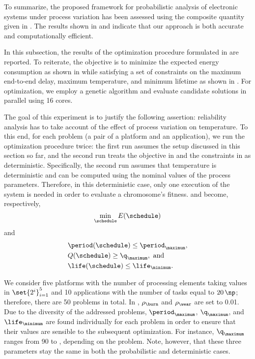 To summarize, the proposed framework for probabilistic analysis of electronic
systems under process variation has been assessed using the composite quantity
given in . The results shown in
 and  indicate
that our approach is both accurate and computationally efficient.


In this subsection, the results of the optimization procedure formulated in
 are reported. To reiterate, the objective is to
minimize the expected energy consumption as shown in
 while satisfying a set of constraints on the
maximum end-to-end delay, maximum temperature, and minimum lifetime as shown in
. For optimization, we employ a genetic
algorithm and evaluate candidate solutions in parallel using 16 cores.

The goal of this experiment is to justify the following assertion: reliability
analysis has to take account of the effect of process variation on temperature.
To this end, for each problem (a pair of a platform and an application), we run
the optimization procedure twice: the first run assumes the setup discussed in
this section so far, and the second run treats the objective in
 and the constraints in
 as deterministic. Specifically, the second
run assumes that temperature is deterministic and can be computed using the
nominal values of the process parameters. Therefore, in this deterministic case,
only one execution of the system is needed in order to evaluate a chromosome's
fitness.  and
 become, respectively,
\[
    \min_{\schedule} E(\schedule)
\]
and
\begin{align*}
  & \period(\schedule) \leq \period_\maximum, \\
  & Q(\schedule) \geq \q_\maximum, \text{ and} \\
  & \life(\schedule) \leq \life_\minimum.
\end{align*}

We consider five platforms with the number of processing elements \np taking
values in $\set{2^i}_{i = 1}^5$ and 10 applications with the number of tasks \nt
equal to $20 \, \np$; therefore, there are 50 problems in total. In
, $\rho_\burn$ and $\rho_\wear$ are set to
0.01. Due to the diversity of the addressed problems, $\period_\maximum$,
$\q_\maximum$, and $\life_\minimum$ are found individually for each problem in
order to ensure that their values are sensible to the subsequent optimization.
For instance, $\q_\maximum$ ranges from 90 to , depending on the
problem. Note, however, that these three parameters stay the same in both the
probabilistic and deterministic cases.

